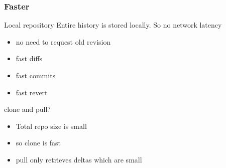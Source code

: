 \begin{frame}
	\frametitle{Faster}
	\begin{block}{Local repository}
		Entire history is stored locally. So no network latency
		\begin{itemize}
			\item no need to request old revision
			\item fast diffs
			\item fast commits
			\item fast revert
		\end{itemize}
	\end{block}
	\begin{block}{clone and pull?}
		\begin{itemize}
			\item Total repo size is small
			\item so clone is fast
			\item pull only retrieves deltas which are small
		\end{itemize}
	\end{block}
\end{frame}
